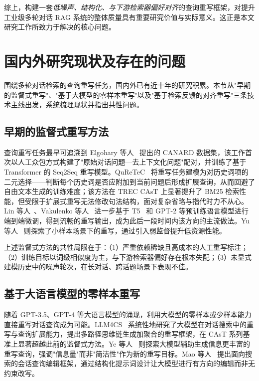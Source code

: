 综上，构建一套\textit{低噪声、结构化、与下游检索器偏好对齐}的查询重写框架，对提升工业级多轮对话 RAG 系统的整体质量具有重要研究价值与实际意义。这正是本文研究工作所致力于解决的核心问题。

\section{国内外研究现状及存在的问题}

围绕多轮对话检索的查询重写任务，国内外已有近十年的研究积累。本节从"早期的监督式重写"、"基于大模型的零样本重写"以及"基于检索反馈的对齐重写"三条技术主线出发，系统梳理现状并指出共性问题。

\subsection{早期的监督式重写方法}

查询重写任务最早可追溯到 Elgohary 等人~\citep{elgohary2019canyouunpack} 提出的 CANARD 数据集，该工作首次以人工众包方式构建了"原始对话问题—去上下文化问题"配对，并训练了基于 Transformer 的 Seq2Seq 重写模型。QuReTeC~\citep{voskarides2020quretec} 将重写任务建模为对历史词项的二元选择——判断每个历史词是否应附加到当前问题后形成扩展查询，从而回避了自由文本生成的训练难度；该方法在 TREC CAsT 上显著提升了 BM25 检索性能，但受限于扩展式重写无法修改句法结构，面对复杂省略与指代时力不从心。Lin 等人~\citep{lin2020conversational}、Vakulenko 等人~\citep{vakulenko2021question} 进一步基于 T5~\citep{raffel2020t5} 和 GPT-2 等预训练语言模型进行端到端微调，得到流畅的重写输出，成为此后一段时间内该方向的主流做法。Yu 等人~\citep{yu2020fewshotgenerative} 则探索了小样本场景下的重写，通过引入弱监督提升低资源性能。

上述监督式方法的共性局限在于：（1）严重依赖稀缺且高成本的人工重写标注；（2）训练目标以词级相似度为主，与下游检索器偏好存在根本失配；（3）未显式建模历史中的噪声轮次，在长对话、跨话题场景下表现不佳。

\subsection{基于大语言模型的零样本重写}

随着 GPT-3.5、GPT-4 等大语言模型的涌现，利用大模型的零样本或少样本能力直接重写对话查询成为可能。LLM4CS~\citep{mao2023llm4cs} 系统性地研究了大模型在对话搜索中的重写与查询扩展能力，提出多路径思维链生成加聚合的重写框架，在 CAsT 系列基准上显著超越此前的监督式方法。Ye 等人~\citep{ye2023enhancing} 则探索大模型辅助生成信息更丰富的重写查询，强调"信息量"而非"简洁性"作为新的重写目标。Mao 等人~\citep{mao2023search} 提出面向搜索的会话查询编辑框架，通过结构化提示词设计让大模型进行有方向的编辑而非无约束改写。

